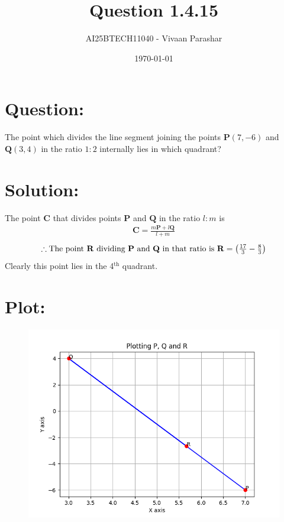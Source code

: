 \documentclass[a4paper, 12pt]{article}
\title{Question 1.4.15}
\author{AI25BTECH11040 - Vivaan Parashar}
\date{\today}
\begin{document}
\maketitle

\section{Question: }
The point which divides the line segment joining the points $\mathbf{P}(7, -6)$ and $\mathbf{Q}(3, 4)$ in the ratio $1 : 2$ internally lies in which quadrant?

\section{Solution: }
The point $\mathbf{C}$ that divides points $\mathbf{P}$ and $\mathbf{Q}$ in the ratio $l : m$ is
\begin{align}
    \mathbf{C} = \frac{m\mathbf{P} + l\mathbf{Q}}{l+m}
\end{align}
\begin{align}
    \therefore \text{The point $\mathbf{R}$ dividing $\mathbf{P}$ and $\mathbf{Q}$ in that ratio is } \mathbf{R} = \begin{pmatrix}\frac{17}{3} -\frac{8}{3}\end{pmatrix}
\end{align}
Clearly this point lies in the 4$^\text{th}$ quadrant.

\pagebreak
\section{Plot: }
\begin{figure}[H]
    \includegraphics[scale=1]{figs/plot.png}
\end{figure}
\end{document}

